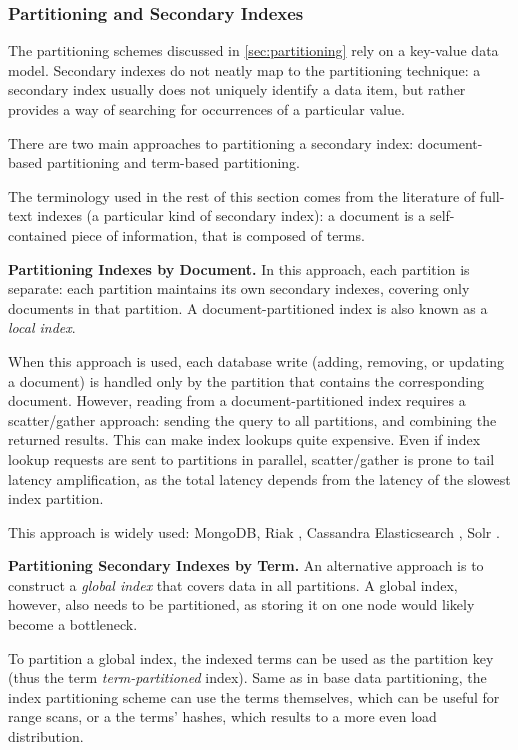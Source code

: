 \subsubsection{Partitioning and Secondary Indexes}

The partitioning schemes discussed in \ref{sec:partitioning} rely on a key-value data model.
Secondary indexes do not neatly map to the partitioning technique:
a secondary index usually does not uniquely identify a data item, but rather provides a way of searching for occurrences
of a particular value.

There are two main approaches to partitioning a secondary index:
document-based partitioning and term-based partitioning.

The terminology used in the rest of this section comes from the literature of full-text indexes (a particular kind of secondary index):
a document is a self-contained piece of information, that is composed of terms.

\bigskip

\noindent
\textbf{Partitioning Indexes by Document.}
In this approach, each partition is separate:
each partition maintains its own secondary indexes, covering only documents in that partition.
A document-partitioned index is also known as a \textit{local index}.

When this approach is used, each database write (adding, removing, or updating a document) is handled only by the
partition that contains the corresponding document.
However, reading from a document-partitioned index requires a scatter/gather approach:
sending the query to all partitions, and combining the returned results.
This can make index lookups quite expensive.
Even if index lookup requests are sent to partitions in parallel, scatter/gather is prone to tail latency amplification,
as the total latency depends from the latency of the slowest index partition.

This approach is widely used: MongoDB, Riak \cite{riakv:secondaryindexes}, Cassandra \cite{cassandra:secondaryindexing}
Elasticsearch \cite{elastic:docrouting}, Solr \cite{solr:indexsharding}.

\bigskip

\noindent
\textbf{Partitioning Secondary Indexes by Term.}
An alternative approach is to construct a \textit{global index} that covers data in all partitions.
A global index, however, also needs to be partitioned, as storing it on one node would likely become a bottleneck.

To partition a global index, the indexed terms can be used as the partition key (thus the term \textit{term-partitioned}
index).
Same as in base data partitioning, the index partitioning scheme can use the terms themselves, which can be useful for
range scans, or a the terms' hashes, which results to a more even load distribution.


